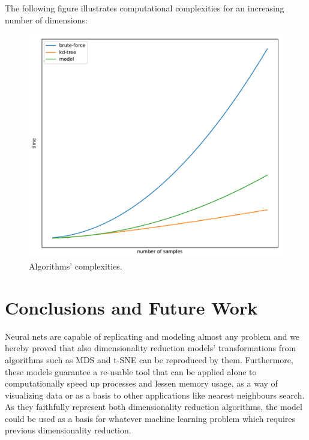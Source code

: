 \documentclass[a4paper,11pt,spanish]{report}
\begin{document}
The following figure illustrates computational complexities for an increasing number of dimensions:

\begin{figure}[h]
\centering
\includegraphics[width=12cm]{figures/complexities.pdf}
\caption{\label{figurecomplexities}Algorithms' complexities.}
\end{figure}






\chapter{Conclusions and Future Work}
\label{chap:conc}

Neural nets are capable of replicating and modeling almost any problem and we hereby proved that also dimensionality reduction models' transformations from algorithms such as MDS and t-SNE can be reproduced by them. Furthermore, these models guarantee a re-usable tool that can be applied alone to computationally speed up processes and lessen memory usage, as a way of visualizing data or as a basis to other applications like nearest neighbours search. As they faithfully represent both dimensionality reduction algorithms, the model could be used as a basis for whatever machine learning problem which requires previous dimensionality reduction.
\end{document}
